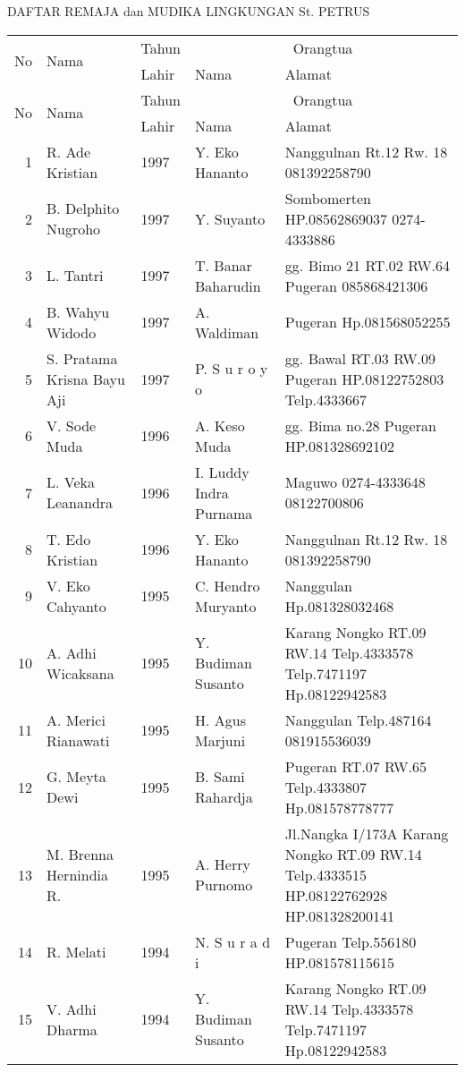 \newpage
\begin{center}
DAFTAR REMAJA dan MUDIKA LINGKUNGAN St. PETRUS
\end{center}
\scriptsize
\begin{longtable}{|r|p{2.75cm}|p{0.75cm}|p{2.75cm}|p{3cm}|}
\hline
\multirow{2}{*}{No}	&\multirow{2}{*}{Nama} &Tahun&\multicolumn{2}{|c|}{Orangtua}\\ \hhline{~~~--}
                     &                      &Lahir&Nama	&Alamat\\ \hline
\endfirsthead
\hline
\multirow{2}{*}{No}	&\multirow{2}{*}{Nama} &Tahun&\multicolumn{2}{|c|}{Orangtua}\\  \hhline{~~~--}
                     &                      &Lahir&Nama	&Alamat\\ \hline
\endhead
1&R. Ade Kristian&1997&Y. Eko Hananto&Nanggulnan Rt.12 Rw. 18 081392258790\\
2&B. Delphito Nugroho&1997&Y. Suyanto&Sombomerten HP.08562869037 0274-4333886\\
3&L. Tantri&1997&T. Banar Baharudin&gg. Bimo 21 RT.02 RW.64 Pugeran 085868421306\\
4&B. Wahyu Widodo&1997&A. Waldiman&Pugeran Hp.081568052255\\
5&S. Pratama Krisna Bayu Aji&1997&P. S u r o y o&gg. Bawal  RT.03 RW.09 Pugeran HP.08122752803 Telp.4333667\\
6&V. Sode Muda&1996&A. Keso Muda&gg. Bima no.28 Pugeran HP.081328692102\\
7&L. Veka Leanandra&1996&I. Luddy Indra Purnama&Maguwo 0274-4333648 08122700806\\
8&T. Edo Kristian&1996&Y. Eko Hananto&Nanggulnan Rt.12 Rw. 18 081392258790\\
9&V. Eko Cahyanto&1995&C. Hendro Muryanto&Nanggulan Hp.081328032468\\
10&A. Adhi Wicaksana&1995&Y. Budiman Susanto&Karang Nongko  RT.09 RW.14 Telp.4333578 Telp.7471197 Hp.08122942583\\
11&A. Merici Rianawati&1995&H. Agus Marjuni&Nanggulan Telp.487164 081915536039\\
12&G. Meyta Dewi&1995&B. Sami Rahardja&Pugeran RT.07 RW.65 Telp.4333807 Hp.081578778777\\
13&M. Brenna Hernindia R.&1995&A. Herry Purnomo&Jl.Nangka I/173A Karang Nongko RT.09 RW.14 Telp.4333515 HP.08122762928 HP.081328200141\\
14&R. Melati&1994&N. S u r a d i&Pugeran Telp.556180 HP.081578115615\\
15&V. Adhi Dharma&1994&Y. Budiman Susanto&Karang Nongko  RT.09 RW.14 Telp.4333578 Telp.7471197 Hp.08122942583\\

\end{longtable}
